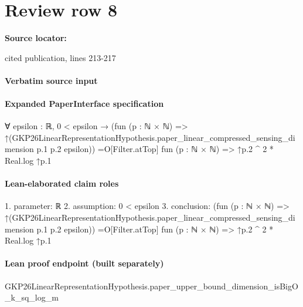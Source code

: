 \documentclass[10pt]{article}
\begin{document}
\section*{Review row 8}
\textbf{Source locator:} {\footnotesize\raggedright cited publication, lines 213-\allowbreak{}217\par}
\paragraph{Verbatim source input}



\paragraph{Expanded PaperInterface specification}
\begin{ReviewVerbatim}
∀ {epsilon : ℝ},
  0 < epsilon →
    (fun (p : ℕ × ℕ) =>
        ↑(GKP26LinearRepresentationHypothesis.paper_linear_compressed_sensing_dimension p.1 p.2
            epsilon)) =O[Filter.atTop]
      fun (p : ℕ × ℕ) => ↑p.2 ^ 2 * Real.log ↑p.1
\end{ReviewVerbatim}

\paragraph{Lean-elaborated claim roles}\begin{ReviewVerbatim}
1. parameter: ℝ
2. assumption: 0 < epsilon
3. conclusion: (fun (p : ℕ × ℕ) =>
    ↑(GKP26LinearRepresentationHypothesis.paper_linear_compressed_sensing_dimension p.1 p.2 epsilon)) =O[Filter.atTop]
  fun (p : ℕ × ℕ) => ↑p.2 ^ 2 * Real.log ↑p.1
\end{ReviewVerbatim}

\paragraph{Lean proof endpoint (built separately)}\begin{ReviewVerbatim}
GKP26LinearRepresentationHypothesis.paper_upper_bound_dimension_isBigO_k_sq_log_m
\end{ReviewVerbatim}
\end{document}
